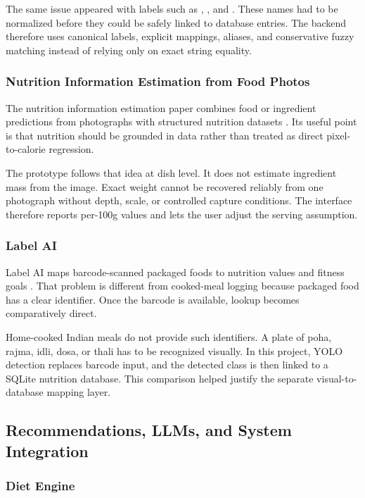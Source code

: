 The same issue appeared with labels such as , , and . These names had to be normalized before they could be safely linked to database entries. The backend therefore uses canonical labels, explicit mappings, aliases, and conservative fuzzy matching instead of relying only on exact string equality.

\subsubsection{Nutrition Information Estimation from Food Photos}

The nutrition information estimation paper combines food or ingredient predictions from photographs with structured nutrition datasets \cite{multitask_nutrition_2022}. Its useful point is that nutrition should be grounded in data rather than treated as direct pixel-to-calorie regression.

The prototype follows that idea at dish level. It does not estimate ingredient mass from the image. Exact weight cannot be recovered reliably from one photograph without depth, scale, or controlled capture conditions. The interface therefore reports per-100g values and lets the user adjust the serving assumption.

\subsubsection{Label AI}

Label AI maps barcode-scanned packaged foods to nutrition values and fitness goals \cite{label_ai_2025}. That problem is different from cooked-meal logging because packaged food has a clear identifier. Once the barcode is available, lookup becomes comparatively direct.

Home-cooked Indian meals do not provide such identifiers. A plate of poha, rajma, idli, dosa, or thali has to be recognized visually. In this project, YOLO detection replaces barcode input, and the detected class is then linked to a SQLite nutrition database. This comparison helped justify the separate visual-to-database mapping layer.

\subsection{Recommendations, LLMs, and System Integration}

\subsubsection{Diet Engine}

